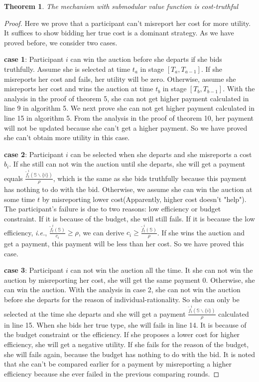\documentclass[conference,compsocconf,letterpaper,10pt]{IEEEtran}
\newtheorem{theorem}{Theorem}
\newcommand{\ie}{{\em i.e.}}
\begin{document}
\begin{theorem}
The mechanism with submodular value function is cost-truthful
\end{theorem}
\begin{proof}
Here we prove that a participant can't misreport her cost for more utility. It suffices to show bidding her true cost is a dominant strategy. As we have proved before, we consider two cases.

\textbf{case 1}: Participant $i$ can win the auction before she departs if she bids truthfully. Assume she is selected at time $t_a$ in stage $[T_a, T_{a-1}]$. If she misreports her cost and fails, her utility will be zero. Otherwise, assume she misreports her cost and wins the auction at time $t_b$ in stage $[T_b,T_{b-1}]$. With the analysis in the proof of theorem 5, she can not get higher payment calculated in line 9 in algorithm 5. We next prove she can not get higher payment calculated in line 15 in algorithm 5. From the analysis in the proof of theorem 10, her payment will not be updated because she can't get a higher payment. So we have proved she can't obtain more utility in this case.

\textbf{case 2}: Participant $i$ can be selected when she departs and she misreports a cost $b_i$. If she still can not win the auction until she departs, she will get a payment equals $\frac{\tilde{f}^i_t(\mathbb{S}\backslash\{i\})}{\rho}$, which is the same as she bids truthfully because this payment has nothing to do with the bid. Otherwise, we assume she can win the auction at some time $t$ by misreporting lower cost(Apparently, higher cost doesn't "help"). The participant's failure is due to two reasons: low efficiency or budget constraint. If it is because of the budget, she will still fails. If it is because the low efficiency, \ie, $\frac{\tilde{f}^i_t(\mathbb{S})}{c_i}\ge\rho$, we can derive $c_i \ge \frac{\tilde{f}^i_t(\mathbb{S})}{\rho}$. If she wins the auction and get a payment, this payment will be less than her cost. So we have proved this case.

\textbf{case 3}: Participant $i$ can not win the auction all the time. It she can not win the auction by misreporting her cost, she will get the same payment 0. Otherwise, she can win the auction. With the analysis in case 2, she can not win the auction before she departs for the reason of individual-rationality. So she can only be selected at the time she departs and she will get a payment $\frac{\tilde{f}^{i}_t(\mathbb{S}\backslash\{{i}\})}{\rho}$ calculated in line 15. When she bids her true type, she will fails in line 14. It is because of the budget constraint or the efficiency. If she proposes a lower cost for higher efficiency, she will get a negative utility. If she fails for the reason of the budget, she will fails again, because the budget has nothing to do with the bid. It is noted that she can't be compared earlier for a payment by misreporting a higher efficiency because she ever failed in the previous comparing rounds.
\end{proof}
\end{document}
